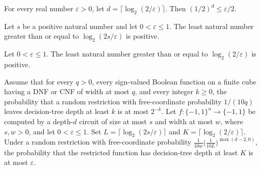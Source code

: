 \begin{theorem}
\label{FABL.half_pow_lmnOutputCutoff_le}
\leanok
{}
For every real number $\varepsilon>0$, let $d=\lceil\log_2(2/\varepsilon)\rceil$. Then
$(1/2)^d\le \varepsilon/2$.
\end{theorem}

\begin{theorem}
\label{FABL.lmnLayerCutoff_pos}
\leanok
{}
Let $s$ be a positive natural number and let $0<\varepsilon\leq1$. The least natural
number greater than or equal to $\log_2(2s/\varepsilon)$ is positive.
\end{theorem}

\begin{theorem}
\label{FABL.lmnOutputCutoff_pos}
\leanok
{}
Let $0<\varepsilon\leq1$. The least natural number greater than or equal to
$\log_2(2/\varepsilon)$ is positive.
\end{theorem}

\begin{theorem}
\label{FABL.lemma4_28_of_halfSwitching}
\leanok
{}
Assume that for every $q>0$, every sign-valued Boolean function on a finite cube having
a DNF or CNF of width at most $q$, and every integer $k\geq0$, the probability that a
random restriction with free-coordinate probability $1/(10q)$ leaves decision-tree depth
at least $k$ is at most $2^{-k}$. Let $f:\{-1,1\}^n\to\{-1,1\}$ be computed by a
depth-$d$ circuit of size at most $s$ and width at most $w$, where $s,w>0$, and let
$0<\varepsilon\leq1$. Set $L=\lceil\log_2(2s/\varepsilon)\rceil$ and
$K=\lceil\log_2(2/\varepsilon)\rceil$. Under a random restriction with free-coordinate
probability $\frac1{10w}\bigl(\frac1{10L}\bigr)^{\max(d-2,0)}$, the probability that the
restricted function has decision-tree depth at least $K$ is at most $\varepsilon$.
\end{theorem}

